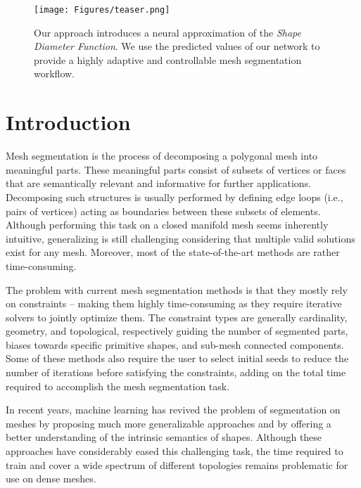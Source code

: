 
\maketitle

\begin{figure}[t]
    \centering
    \texttt{[image: Figures/teaser.png]}
    \caption{Our approach introduces a neural approximation of the \textit{Shape Diameter Function}. We use the predicted values of our network to provide a highly adaptive and controllable mesh segmentation workflow.}
    \label{fig:teaser}
\end{figure}

\section{Introduction}
Mesh segmentation is the process of decomposing a polygonal mesh into meaningful parts. These meaningful parts consist of subsets of vertices or faces that are semantically relevant and informative for further applications. Decomposing such structures is usually performed by defining edge loops (i.e., pairs of vertices) acting as boundaries between these subsets of elements. Although performing this task on a closed manifold mesh seems inherently intuitive, generalizing is still challenging considering that multiple valid solutions exist for any mesh. Moreover, most of the state-of-the-art methods are rather time-consuming.

The problem with current mesh segmentation methods is that they mostly rely on constraints -- making them highly time-consuming as they require iterative solvers to jointly optimize them. The constraint types are generally cardinality, geometry, and topological, respectively guiding the number of segmented parts, biases towards specific primitive shapes, and sub-mesh connected components. Some of these methods also require the user to select initial seeds to reduce the number of iterations before satisfying the constraints, adding on the total time required to accomplish the mesh segmentation task.

In recent years, machine learning has revived the problem of segmentation on meshes by proposing much more generalizable approaches and by offering a better understanding of the intrinsic semantics of shapes. Although these approaches have considerably eased this challenging task, the time required to train and cover a wide spectrum of different topologies remains problematic for use on dense meshes.


